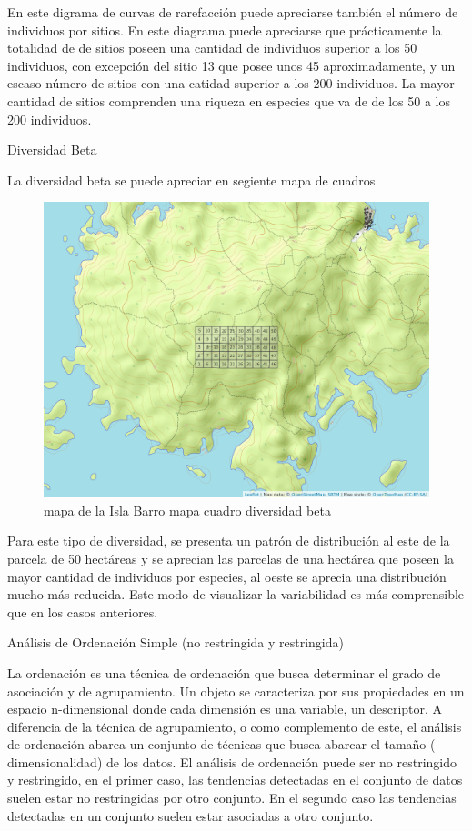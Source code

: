 \documentclass[11pt,]{article}
\begin{document}
En este digrama de curvas de rarefacción puede apreciarse también el
número de individuos por sitios. En este diagrama puede apreciarse que
prácticamente la totalidad de de sitios poseen una cantidad de
individuos superior a los 50 individuos, con excepción del sitio 13 que
posee unos 45 aproximadamente, y un escaso número de sitios con una
catidad superior a los 200 individuos. La mayor cantidad de sitios
comprenden una riqueza en especies que va de de los 50 a los 200
individuos.

Diversidad Beta

La diversidad beta se puede apreciar en segiente mapa de cuadros

\begin{figure}
\centering
\includegraphics[width=1.00000\textwidth]{mapa_cuadros.png}
\caption{mapa de la Isla Barro mapa cuadro diversidad beta
\label{fig:bci_map}}
\end{figure}

Para este tipo de diversidad, se presenta un patrón de distribución al
este de la parcela de 50 hectáreas y se aprecian las parcelas de una
hectárea que poseen la mayor cantidad de individuos por especies, al
oeste se aprecia una distribución mucho más reducida. Este modo de
visualizar la variabilidad es más comprensible que en los casos
anteriores.

Análisis de Ordenación Simple (no restringida y restringida)

La ordenación es una técnica de ordenación que busca determinar el grado
de asociación y de agrupamiento. Un objeto se caracteriza por sus
propiedades en un espacio n-dimensional donde cada dimensión es una
variable, un descriptor. A diferencia de la técnica de agrupamiento, o
como complemento de este, el análisis de ordenación abarca un conjunto
de técnicas que busca abarcar el tamaño ( dimensionalidad) de los datos.
El análisis de ordenación puede ser no restringido y restringido, en el
primer caso, las tendencias detectadas en el conjunto de datos suelen
estar no restringidas por otro conjunto. En el segundo caso las
tendencias detectadas en un conjunto suelen estar asociadas a otro
conjunto.
\end{document}
